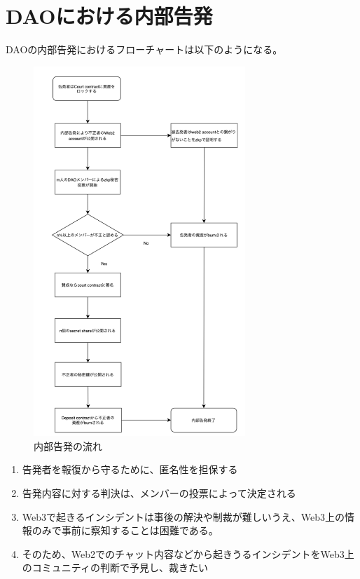 \documentclass[twocolumn,a4j]{jarticle}
\begin{document}
\section{DAOにおける内部告発}
DAOの内部告発におけるフローチャートは以下のようになる。
\begin{figure}[htbp]
  \begin{center}
    \includegraphics[width=80mm]{flow.png}
    \caption{内部告発の流れ}
  \end{center}
\end{figure}
\begin{enumerate}
  \item 告発者を報復から守るために、匿名性を担保する
  \item 告発内容に対する判決は、メンバーの投票によって決定される
  \item Web3で起きるインシデントは事後の解決や制裁が難しいうえ、Web3上の情報のみで事前に察知することは困難である。
  \item そのため、Web2でのチャット内容などから起きうるインシデントをWeb3上のコミュニティの判断で予見し、裁きたい
\end{enumerate}
\end{document}

